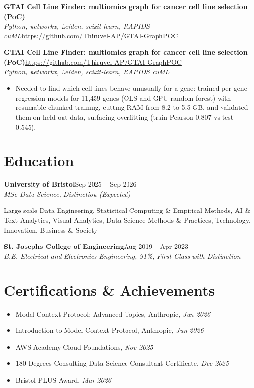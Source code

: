 \documentclass[a4paper,11pt]{article}
\newcommand{\roleNoLoc}[3]{\textbf{#1}\hfill{\color{muted}#2}\\ \textit{#3}\par}
\newcommand{\project}[3]{%
  \textbf{#1}\hfill#3\\ {\color{muted}\small\textit{#2}}\par}
\newcommand{\gap}{\vspace{5pt}}
\begin{document}
\else
\textbf{GTAI Cell Line Finder: multiomics graph for cancer cell line selection (PoC)}\\ {\color{muted}\small\textit{Python, networkx, Leiden, scikit-learn, RAPIDS cuML}}\hfill{\small\url{https://github.com/Thiruvel-AP/GTAI-GraphPOC}}\par
\fi
\else
\project{GTAI Cell Line Finder: multiomics graph for cancer cell line selection (PoC)}{Python, networkx, Leiden, scikit-learn, RAPIDS cuML}{\url{https://github.com/Thiruvel-AP/GTAI-GraphPOC}}
\fi
\begin{itemize}
  \item Needed to find which cell lines behave unusually for a gene: trained per gene regression models for 11,459 genes (OLS and GPU random forest) with resumable chunked training, cutting RAM from 8.2 to 5.5 GB, and validated them on held out data, surfacing overfitting (train Pearson 0.807 vs test 0.545).
\end{itemize}

\section{Education}
\roleNoLoc{University of Bristol}{Sep 2025 – Sep 2026}{MSc Data Science, Distinction \textit{(Expected)}}
{\color{muted}\small Large scale Data Engineering, Statistical Computing \& Empirical Methods, AI \& Text Analytics, Visual Analytics, Data Science Methods \& Practices, Technology, Innovation, Business \& Society}\par
\gap
{}
\roleNoLoc{St. Joseph\textquotesingle{}s College of Engineering}{Aug 2019 – Apr 2023}{B.E. Electrical and Electronics Engineering, 91\%, First Class with Distinction}

\section{Certifications \& Achievements}
\begin{itemize}
  \item Model Context Protocol: Advanced Topics, Anthropic, \textit{Jun 2026}
  \item Introduction to Model Context Protocol, Anthropic, \textit{Jun 2026}
  \item AWS Academy Cloud Foundations, \textit{Nov 2025}
  \item 180 Degrees Consulting Data Science Consultant Certificate, \textit{Dec 2025}
  \item Bristol PLUS Award, \textit{Mar 2026}
\end{itemize}
\end{document}
